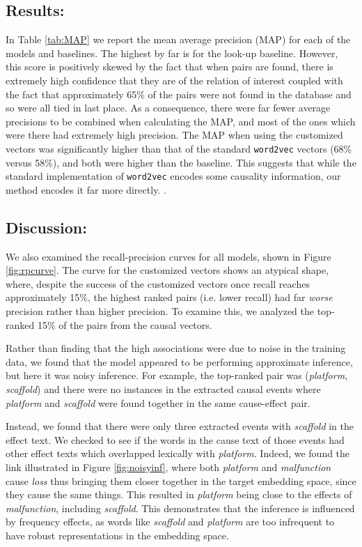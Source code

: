 \subsection{Results:}
In Table \ref{tab:MAP} we report the mean average precision (MAP) for each of the models and baselines.  The highest by far is for the look-up baseline.  However, this score is positively skewed by the fact that when pairs are found, there is extremely high confidence that they are of the relation of interest coupled with the fact that approximately 65\% of the pairs were not found in the database and so were all tied in last place.  As a consequence, there were far fewer average precisions to be combined when calculating the MAP, and most of the ones which were there had extremely high precision.  The MAP when using the customized vectors was significantly higher than that of the standard \texttt{word2vec} vectors (68\% versus 58\%), and both were higher than the baseline.  This suggests that while the standard implementation of \texttt{word2vec} encodes some causality information, our method encodes it far more directly. .

\subsection{Discussion:}
We also examined the recall-precision curves for all models, shown in Figure \ref{fig:rpcurve}.  The curve for the customized vectors shows an atypical shape, where, despite the success of the customized vectors once recall reaches approximately 15\%, the highest ranked pairs (i.e. lower recall) had far \emph{worse} precision rather than higher precision.  To examine this, we analyzed the top-ranked 15\% of the pairs from the causal vectors.  

Rather than finding that the high associations were due to noise in the training data, we found that the model appeared to be performing approximate inference, but here it was noisy inference.  For example, the top-ranked pair was (\emph{platform}, \emph{scaffold}) and there were no instances in the extracted causal events where \emph{platform} and \emph{scaffold} were found together in the same cause-effect pair.  

Instead, we found that there were only three extracted events with \emph{scaffold} in the effect text.  We checked to see if the words in the cause text of those events had other effect texts which overlapped lexically with \emph{platform}.  Indeed, we found the link illustrated in Figure \ref{fig:noisyinf}, where both \emph{platform} and \emph{malfunction} cause \emph{loss} thus bringing them closer together in the target embedding space, since they cause the same things.  This resulted in \emph{platform} being close to the effects of \emph{malfunction}, including \emph{scaffold}.  This demonstrates that the inference is influenced by frequency effects, as words like \emph{scaffold} and \emph{platform} are too infrequent to have robust representations in the embedding space.  

